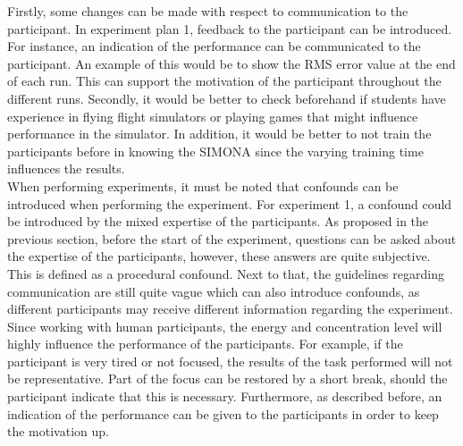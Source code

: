 \documentclass[conference]{IEEEtran}
\begin{document}


Firstly, some changes can be made with respect to communication to the participant. In experiment plan 1, feedback to the participant can be introduced. For instance, an indication of the performance can be communicated to the participant. An example of this would be to show the RMS error value at the end of each run. This can support the motivation of the participant throughout the different runs. Secondly, it would be better to check beforehand if students have experience in flying flight simulators or playing games that might influence performance in the simulator. In addition, it would be better to not train the participants before in knowing the SIMONA since the varying training time influences the results.\\

When performing experiments, it must be noted that confounds can be introduced when performing the experiment. For experiment 1, a confound could be introduced by the mixed expertise of the participants. As proposed in the previous section, before the start of the experiment, questions can be asked about the expertise of the participants, however, these answers are quite subjective. This is defined as a procedural confound. Next to that, the guidelines regarding communication are still quite vague which can also introduce confounds, as different participants may receive different information regarding the experiment. Since working with human participants, the energy and concentration level will highly influence the performance of the participants. For example, if the participant is very tired or not focused, the results of the task performed will not be representative. Part of the focus can be restored by a short break, should the participant indicate that this is necessary. Furthermore, as described before, an indication of the performance can be given to the participants in order to keep the motivation up.\\ %
\end{document}
